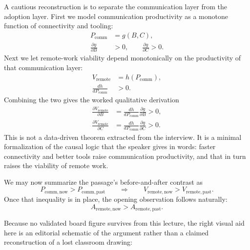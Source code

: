 A cautious reconstruction is to separate the communication layer from the adoption layer. First we model communication productivity as a monotone function of connectivity and tooling:
\begin{align}
P_{\mathrm{comm}} &= g(B,C),\\
\frac{\partial g}{\partial B} &> 0,
\qquad
\frac{\partial g}{\partial C} > 0 .
\end{align}
Next we let remote-work viability depend monotonically on the productivity of that communication layer:
\begin{align}
V_{\mathrm{remote}} &= h(P_{\mathrm{comm}}),\\
\frac{dh}{dP_{\mathrm{comm}}} &> 0 .
\end{align}
Combining the two gives the worked qualitative derivation
\begin{align}
\frac{\partial V_{\mathrm{remote}}}{\partial B}
&=
\frac{dh}{dP_{\mathrm{comm}}}
\frac{\partial g}{\partial B}
>0,\\
\frac{\partial V_{\mathrm{remote}}}{\partial C}
&=
\frac{dh}{dP_{\mathrm{comm}}}
\frac{\partial g}{\partial C}
>0 .
\end{align}
This is not a data-driven theorem extracted from the interview. It is a minimal formalization of the causal logic that the speaker gives in words: faster connectivity and better tools raise communication productivity, and that in turn raises the viability of remote work.

We may now summarize the passage's before-and-after contrast as
\begin{equation}
P_{\mathrm{comm},\mathrm{now}} > P_{\mathrm{comm},\mathrm{past}}
\qquad\Longrightarrow\qquad
V_{\mathrm{remote},\mathrm{now}} > V_{\mathrm{remote},\mathrm{past}} .
\end{equation}
Once that inequality is in place, the opening observation follows naturally:
\begin{equation}
A_{\mathrm{remote},\mathrm{now}} > A_{\mathrm{remote},\mathrm{past}} .
\end{equation}

Because no validated board figure survives from this lecture, the right visual aid here is an editorial schematic of the argument rather than a claimed reconstruction of a lost classroom drawing:

